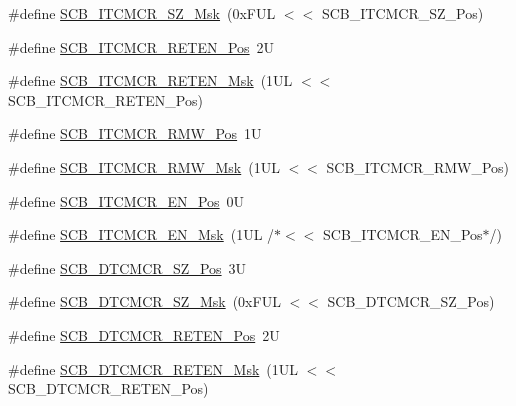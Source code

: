 \begin{DoxyCompactItemize}
\item 
\#define \mbox{\hyperlink{group__CMSIS__SCB_ga2aca0f00fd91071567dfa596eaa136de}{S\+C\+B\+\_\+\+I\+T\+C\+M\+C\+R\+\_\+\+S\+Z\+\_\+\+Msk}}~(0x\+F\+U\+L $<$$<$ S\+C\+B\+\_\+\+I\+T\+C\+M\+C\+R\+\_\+\+S\+Z\+\_\+\+Pos)
\item 
\#define \mbox{\hyperlink{group__CMSIS__SCB_ga1094e5655c0e9572ecd562fa4a7d5f21}{S\+C\+B\+\_\+\+I\+T\+C\+M\+C\+R\+\_\+\+R\+E\+T\+E\+N\+\_\+\+Pos}}~2U
\item 
\#define \mbox{\hyperlink{group__CMSIS__SCB_ga6f7d14ca4c78b7fd64157d9f8110f188}{S\+C\+B\+\_\+\+I\+T\+C\+M\+C\+R\+\_\+\+R\+E\+T\+E\+N\+\_\+\+Msk}}~(1\+U\+L $<$$<$ S\+C\+B\+\_\+\+I\+T\+C\+M\+C\+R\+\_\+\+R\+E\+T\+E\+N\+\_\+\+Pos)
\item 
\#define \mbox{\hyperlink{group__CMSIS__SCB_ga33901f7f35fe403c82a9641a0d35ae92}{S\+C\+B\+\_\+\+I\+T\+C\+M\+C\+R\+\_\+\+R\+M\+W\+\_\+\+Pos}}~1U
\item 
\#define \mbox{\hyperlink{group__CMSIS__SCB_ga0e3b9b0855837e95e4b0fc6d36cd604b}{S\+C\+B\+\_\+\+I\+T\+C\+M\+C\+R\+\_\+\+R\+M\+W\+\_\+\+Msk}}~(1\+U\+L $<$$<$ S\+C\+B\+\_\+\+I\+T\+C\+M\+C\+R\+\_\+\+R\+M\+W\+\_\+\+Pos)
\item 
\#define \mbox{\hyperlink{group__CMSIS__SCB_ga5d2fc7c04a8aaedff19bd4ff6de187eb}{S\+C\+B\+\_\+\+I\+T\+C\+M\+C\+R\+\_\+\+E\+N\+\_\+\+Pos}}~0U
\item 
\#define \mbox{\hyperlink{group__CMSIS__SCB_ga4d1c57f26a03910ab0549efecd2a602c}{S\+C\+B\+\_\+\+I\+T\+C\+M\+C\+R\+\_\+\+E\+N\+\_\+\+Msk}}~(1\+U\+L /$\ast$$<$$<$ S\+C\+B\+\_\+\+I\+T\+C\+M\+C\+R\+\_\+\+E\+N\+\_\+\+Pos$\ast$/)
\item 
\#define \mbox{\hyperlink{group__CMSIS__SCB_ga3cacd7498eb3c022ecc7e21a3dfc3c13}{S\+C\+B\+\_\+\+D\+T\+C\+M\+C\+R\+\_\+\+S\+Z\+\_\+\+Pos}}~3U
\item 
\#define \mbox{\hyperlink{group__CMSIS__SCB_ga35b381dd367cd1533f5c2b2c88720b72}{S\+C\+B\+\_\+\+D\+T\+C\+M\+C\+R\+\_\+\+S\+Z\+\_\+\+Msk}}~(0x\+F\+U\+L $<$$<$ S\+C\+B\+\_\+\+D\+T\+C\+M\+C\+R\+\_\+\+S\+Z\+\_\+\+Pos)
\item 
\#define \mbox{\hyperlink{group__CMSIS__SCB_ga8b72fb208ee772734e580911a8e522ce}{S\+C\+B\+\_\+\+D\+T\+C\+M\+C\+R\+\_\+\+R\+E\+T\+E\+N\+\_\+\+Pos}}~2U
\item 
\#define \mbox{\hyperlink{group__CMSIS__SCB_gaa69bbf5b17808383d88f23a424c1b62e}{S\+C\+B\+\_\+\+D\+T\+C\+M\+C\+R\+\_\+\+R\+E\+T\+E\+N\+\_\+\+Msk}}~(1\+U\+L $<$$<$ S\+C\+B\+\_\+\+D\+T\+C\+M\+C\+R\+\_\+\+R\+E\+T\+E\+N\+\_\+\+Pos)
\item 
$$
\end{DoxyCompactItemize}

